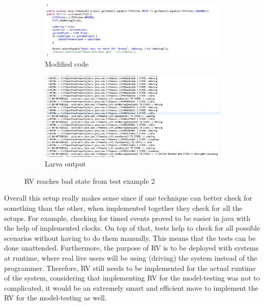 \documentclass[a4paper, 12pt]{article}
\begin{document}
\begin{figure}
\centering
\begin{subfigure}{.5\textwidth}
  \centering
  \includegraphics[width=\linewidth]{images/larva-test-fail-2-code}
  \caption{Modified code}
\end{subfigure}%
\begin{subfigure}{.5\textwidth}
  \centering
  \includegraphics[width=\linewidth]{images/larva-test-fail-2-output}
  \caption{Larva output}
\end{subfigure}
\caption{RV reaches bad state from test example 2}
\label{fig:larva-test-fail-2}
\end{figure}

Overall this setup really makes sense since if one technique can better check for something than the other, when implemented together they check for all the setups. For example, checking for timed events proved to be easier in java with the help of implemented clocks. On top of that, tests help to check for all possible scenarios without having to do them manually. This means that the tests can be done unattended. Furthermore, the purpose of RV is to be deployed with systems at runtime, where real live users will be using (driving) the system instead of the programmer. Therefore, RV still needs to be implemented for the actual runtime of the system, considering that implementing RV for the model-testing was not to complicated, it would be an extremely smart and efficient move to implement the RV for the model-testing as well. \\
\end{document}
